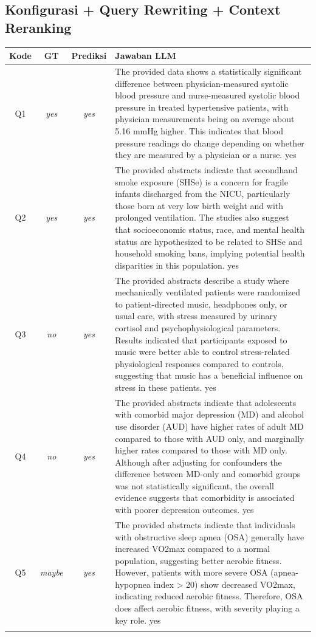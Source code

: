 \subsection*{Konfigurasi + Query Rewriting + Context Reranking}
\begin{longtable}{@{}c c c >{\raggedright\arraybackslash}p{8.8cm}@{}}
\toprule
\textbf{Kode} & \textbf{GT} & \textbf{Prediksi} & \textbf{Jawaban LLM} \\
\midrule\endhead
Q1 & \textit{yes} & \textit{yes} & The provided data shows a statistically significant difference between physician-measured systolic blood pressure and nurse-measured systolic blood pressure in treated hypertensive patients, with physician measurements being on average about 5.16 mmHg higher. This indicates that blood pressure readings do change depending on whether they are measured by a physician or a nurse. yes \\
\addlinespace
Q2 & \textit{yes} & \textit{yes} & The provided abstracts indicate that secondhand smoke exposure (SHSe) is a concern for fragile infants discharged from the NICU, particularly those born at very low birth weight and with prolonged ventilation. The studies also suggest that socioeconomic status, race, and mental health status are hypothesized to be related to SHSe and household smoking bans, implying potential health disparities in this population. yes \\
\addlinespace
Q3 & \textit{no} & \textit{yes} & The provided abstracts describe a study where mechanically ventilated patients were randomized to patient-directed music, headphones only, or usual care, with stress measured by urinary cortisol and psychophysiological parameters. Results indicated that participants exposed to music were better able to control stress-related physiological responses compared to controls, suggesting that music has a beneficial influence on stress in these patients. yes \\
\addlinespace
Q4 & \textit{no} & \textit{yes} & The provided abstracts indicate that adolescents with comorbid major depression (MD) and alcohol use disorder (AUD) have higher rates of adult MD compared to those with AUD only, and marginally higher rates compared to those with MD only. Although after adjusting for confounders the difference between MD-only and comorbid groups was not statistically significant, the overall evidence suggests that comorbidity is associated with poorer depression outcomes. yes \\
\addlinespace
Q5 & \textit{maybe} & \textit{yes} & The provided abstracts indicate that individuals with obstructive sleep apnea (OSA) generally have increased VO2max compared to a normal population, suggesting better aerobic fitness. However, patients with more severe OSA (apnea-hypopnea index > 20) show decreased VO2max, indicating reduced aerobic fitness. Therefore, OSA does affect aerobic fitness, with severity playing a key role. yes \\
\addlinespace
\bottomrule
\end{longtable}
